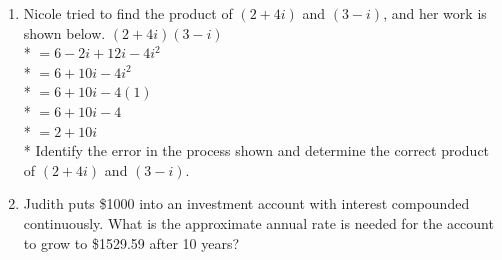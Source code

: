 \documentclass[12pt, oneside]{article}
\begin{document}
\begin{enumerate}
\item Nicole tried to find the product of $(2+ 4i)$ and $(3 - i)$, and her work is shown below.
$(2 + 4i)(3 - i)$\\*
$=6 - 2i + 12i - 4i^2$\\*
$=6 + 10i - 4i^2$\\*
$=6 + 10i - 4(1)$\\*
$=6 + 10i - 4$\\*
$=2 + 10i$\\*
Identify the error in the process shown and determine the correct product of $(2+ 4i)$ and $(3 - i)$.%

\item Judith puts \$1000 into an investment account with interest compounded continuously. What is the approximate annual rate is needed for the account to grow to \$1529.59 after 10 years?


\end{enumerate}
\end{document}
